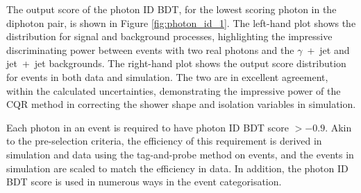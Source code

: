 The output score of the photon ID BDT, for the lowest scoring photon in the diphoton pair, is shown in Figure \ref{fig:photon_id_1}. The left-hand plot shows the distribution for signal and background processes, highlighting the impressive discriminating power between events with two real photons and the $\gamma$~+~jet and jet~+~jet backgrounds. The right-hand plot shows the output score distribution for \Zee events in both data and simulation. The two are in excellent agreement, within the calculated uncertainties, demonstrating the impressive power of the CQR method in correcting the shower shape and isolation variables in simulation. 

Each photon in an event is required to have photon ID BDT score $>-0.9$. Akin to the pre-selection criteria, the efficiency of this requirement is derived in simulation and data using the tag-and-probe method on \Zee events, and the events in simulation are scaled to match the efficiency in data. In addition, the photon ID BDT score is used in numerous ways in the event categorisation.

